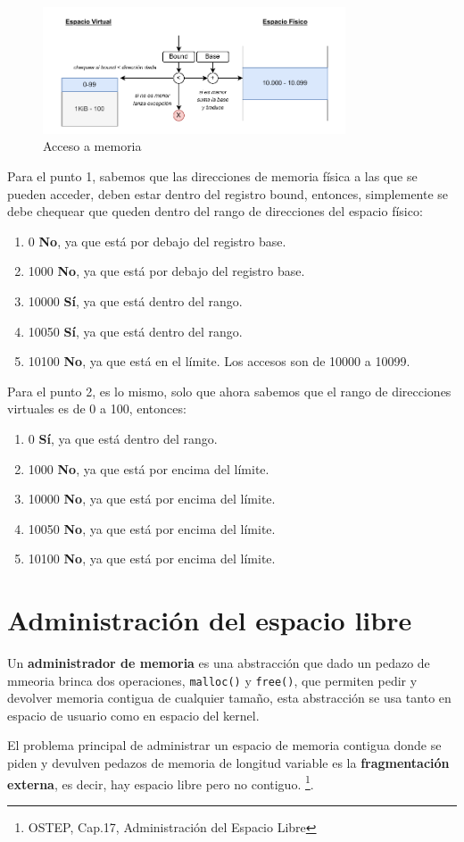 \documentclass{article}
\begin{document}
\begin{figure}[h]
    \centering
    \includegraphics[width=0.8\textwidth]{src/ejtrad2.pdf}
    \caption{Acceso a memoria}
\end{figure}

\newpage
Para el punto 1, sabemos que las direcciones de memoria física a las que se pueden acceder, deben estar dentro del registro bound, entonces, simplemente se debe chequear que queden dentro del rango de direcciones del espacio físico:
\begin{enumerate}
    \item 0 \textbf{No}, ya que está por debajo del registro base.
    \item 1000 \textbf{No}, ya que está por debajo del registro base.
    \item 10000 \textbf{Sí}, ya que está dentro del rango.
    \item 10050 \textbf{Sí}, ya que está dentro del rango.
    \item 10100 \textbf{No}, ya que está en el límite. Los accesos son de 10000 a 10099.
\end{enumerate}
Para el punto 2, es lo mismo, solo que ahora sabemos que el rango de direcciones virtuales es de 0 a 100, entonces:
\begin{enumerate}
    \item 0 \textbf{Sí}, ya que está dentro del rango.
    \item 1000 \textbf{No}, ya que está por encima del límite.
    \item 10000 \textbf{No}, ya que está por encima del límite.
    \item 10050 \textbf{No}, ya que está por encima del límite.
    \item 10100 \textbf{No}, ya que está por encima del límite.
\end{enumerate}

\section{Administración del espacio libre}
\begin{definition}
    Un \textbf{administrador de memoria} es una abstracción que dado un pedazo de mmeoria brinca dos operaciones, \texttt{malloc()} y \texttt{free()}, que permiten pedir y devolver memoria contigua de cualquier tamaño, esta abstracción se usa tanto en espacio de usuario como en espacio del kernel.
\end{definition}
El problema principal de administrar un espacio de memoria contigua donde se piden y devulven pedazos de memoria de longitud variable es la \textbf{fragmentación externa}, es decir, hay espacio libre pero no contiguo. 
\footnote{OSTEP, Cap.17, Administración del Espacio Libre}. 
\end{document}
